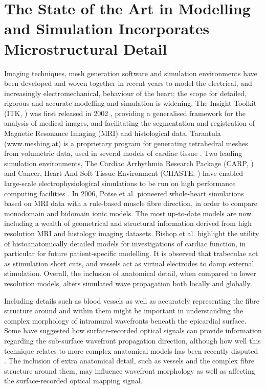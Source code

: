 \section{The State of the Art in Modelling and Simulation Incorporates Microstructural Detail} %
\label{sec:the_state_of_the_art_in_microstructural_modelling_and_simulation_incorporates_microstructural_detail}
  Imaging techniques, mesh generation software and simulation environments have been developed and woven together in recent years to model the electrical, and increasingly electromechanical, behaviour of the heart; the scope for detailed, rigorous and accurate modelling and simulation is widening. The Insight Toolkit (ITK, \cite{Yoo:2002p160}) was first released in 2002 , providing a generalised framework for the analysis of medical images, and facilitating the segmentation and registration of Magnetic Resonance Imaging (MRI) and histological data. Tarantula (www.meshing.at) is a proprietary program for generating tetrahedral meshes from volumetric data, used in several models of cardiac tissue \cite{Bernabeu:2008p869, Bishop:2006p55, Plank:2009p440}. Two leading simulation environments, The Cardiac Arrhythmia Research Package (CARP, \cite{Vigmond:2003p657}) and Cancer, Heart And Soft Tissue Environment (CHASTE, \cite{PittFrancis:2008p894, PittFrancis:2009p930, PittFrancis:2009p895}) have enabled large-scale electrophysiological simulations to be run on high performance computing facilities \cite{Bernabeu:2008p869}. In 2006, Potse et al. \cite{Potse:2006p446} pioneered whole-heart simulations based on MRI data with a rule-based muscle fibre direction, in order to compare monodomain and bidomain ionic models. The most up-to-date models \cite{Burton:2006p100, Plank:2009p440} are now including a wealth of geometrical and structural information derived from high resolution MRI and histology imaging datasets. Bishop et al. \cite{Bishop:2009p444} highlight the utility of histoanatomically detailed models for investigations of cardiac function, in particular for future patient-specific modelling. It is observed that trabeculae act as stimulation short cuts, and vessels act as virtual electrodes to damp external stimulation. Overall, the inclusion of anatomical detail, when compared to lower resolution models, alters simulated wave propagation both locally and globally.

Including details such as blood vessels as well as accurately representing the fibre structure around and within them might be important in understanding the complex morphology of intramural wavefronts beneath the epicardial surface. Some \cite{Ding:2001p668, Hyatt:2003p670} have suggested how surface-recorded optical signals can provide information regarding the sub-surface wavefront propagation direction, although how well this technique relates to more complex anatomical models has been recently disputed  \cite{Bishop:2006p666}. The inclusion of extra anatomical detail, such as vessels and the complex fibre structure around them, may influence wavefront morphology as well as affecting the surface-recorded optical mapping signal.
  
